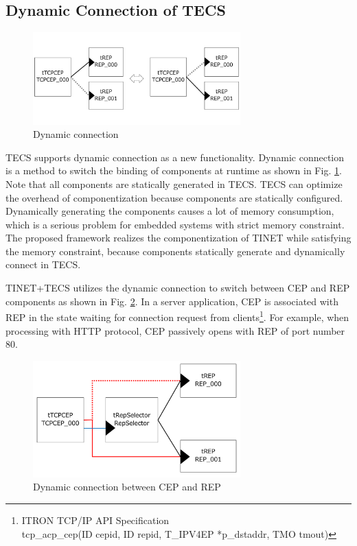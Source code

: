 \documentclass[conference]{IEEEtran/IEEEtran}
\begin{document}
\subsection{Dynamic Connection of TECS}
\label{sec:DynamicConnection}

\begin{figure}[t]
    \centering
    \includegraphics[width=8.0cm,clip]{figure/DynamicConnection.pdf}
    \caption{Dynamic connection}
    \label{fig:DynamicConnection}
\end{figure}

TECS supports dynamic connection as a new functionality.
Dynamic connection is a method to switch the binding of components at runtime as shown in Fig. \ref{fig:DynamicConnection}.
Note that all components are statically generated in TECS.
TECS can optimize the overhead of componentization because components are statically configured.
Dynamically generating the components causes a lot of memory consumption, which is a serious problem for embedded systems with strict memory constraint.
The proposed framework realizes the componentization of TINET while satisfying the memory constraint, because components statically generate and dynamically connect in TECS.

TINET+TECS utilizes the dynamic connection to switch between CEP and REP components as shown in Fig. \ref{fig:DynamicConnectionUseCase}.
In a server application, CEP is associated with REP in the state waiting for connection request from clients\footnote{ITRON TCP/IP API Specification \cite{url:ITRON_TCP/IP_API_Spec}\\tcp\_acp\_cep(ID cepid, ID repid, T\_IPV4EP *p\_dstaddr, TMO tmout)}.
For example, when processing with HTTP protocol, CEP passively opens with REP of port number 80.

\begin{figure}[t]
    \centering
    \includegraphics[width=8.0cm,clip]{figure/DynamicConnectionUseCase.pdf}
    \caption{Dynamic connection between CEP and REP}
    \label{fig:DynamicConnectionUseCase}
\end{figure}
\end{document}
